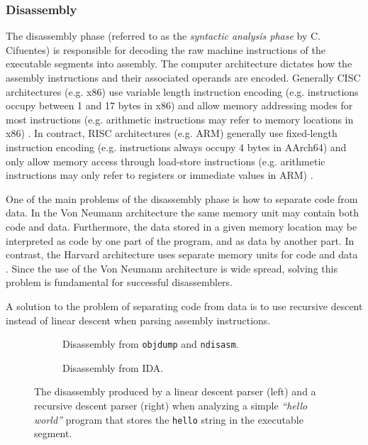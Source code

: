 
\subsubsection{Disassembly}
\label{sec:lit_review_disassembly}

The disassembly phase (referred to as the \textit{syntactic analysis phase} by C. Cifuentes) is responsible for decoding the raw machine instructions of the executable segments into assembly. The computer architecture dictates how the assembly instructions and their associated operands are encoded. Generally CISC architectures (e.g. x86) use variable length instruction encoding (e.g. instructions occupy between 1 and 17 bytes in x86) and allow memory addressing modes for most instructions (e.g. arithmetic instructions may refer to memory locations in x86) \cite{x86_manual}. In contract, RISC architectures (e.g. ARM) generally use fixed-length instruction encoding (e.g. instructions always occupy 4 bytes in AArch64) and only allow memory access through load-store instructions (e.g. arithmetic instructions may only refer to registers or immediate values in ARM) \cite{arm_manual}.

One of the main problems of the disassembly phase is how to separate code from data. In the Von Neumann architecture the same memory unit may contain both code and data. Furthermore, the data stored in a given memory location may be interpreted as code by one part of the program, and as data by another part. In contrast, the Harvard architecture uses separate memory units for code and data \cite{von_neumann_vs_harvard}. Since the use of the Von Neumann architecture is wide spread, solving this problem is fundamental for successful disassemblers.


A solution to the problem of separating code from data is to use recursive descent instead of linear descent when parsing assembly instructions.


\begin{figure}[htbp]
	\centering
	\begin{subfigure}[t]{0.49\textwidth}
		
		\caption{Disassembly from \texttt{objdump} and \texttt{ndisasm}\protect\footnotemark.}
	\end{subfigure}
	\qquad
	\begin{subfigure}[t]{0.35\textwidth}
		
		\caption{Disassembly from IDA.}
	\end{subfigure}
	\caption{The disassembly produced by a linear descent parser (left) and a recursive descent parser (right) when analyzing a simple \textit{``hello world''} program that stores the \texttt{hello} string in the executable segment.}
\end{figure}

